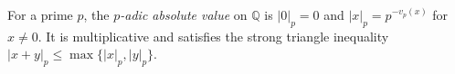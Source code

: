 
For a prime $p$, the \emph{$p$-adic absolute value} on $\mathbb Q$ is $|0|_p=0$ and $|x|_p=p^{-v_p(x)}$ for $x\ne0$. It is multiplicative and satisfies the strong triangle inequality $|x+y|_p\le\max\{|x|_p,|y|_p\}$.
